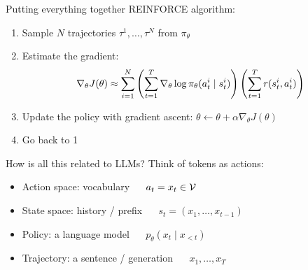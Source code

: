 \documentclass[usenames,dvipsnames,notes,11pt,aspectratio=169,hyperref={colorlinks=true, linkcolor=blue}]{beamer}
\begin{document}
\begin{frame}
    {Putting everything together}
    REINFORCE algorithm:\\
    \begin{enumerate}
        \item Sample $N$ trajectories $\tau^1,\ldots,\tau^N$ from $\pi_\theta$
        \item Estimate the gradient: 
            $$
            \nabla_\theta J(\theta) \approx \sum_{i=1}^N
            \left( \sum_{t=1}^T \nabla_\theta\log\pi_\theta(a_t^i\mid s_t^i) \right)
            \left( \sum_{t=1}^T r(s_t^i,a_t^i)  \right)
            $$
        \item Update the policy with gradient ascent: $\theta \leftarrow \theta + \alpha \nabla_\theta J(\theta)$
        \item Go back to 1
    \end{enumerate}
\end{frame}

\begin{frame}
    {How is all this related to LLMs?}{}
    Think of tokens as actions:\\
    \begin{itemize}
        \item Action space: vocabulary $\quad$ $a_t = x_t\in\mathcal{V}$
        \item State space: history / prefix $\quad$ $s_t = (x_1,\ldots,x_{t-1})$
        \item Policy: a language model $\quad$ $p_\theta(x_t\mid x_{<t})$
        \item Trajectory: a sentence / generation $\quad$ $x_1,\ldots,x_T$
    \end{itemize}
\end{frame}
\end{document}
